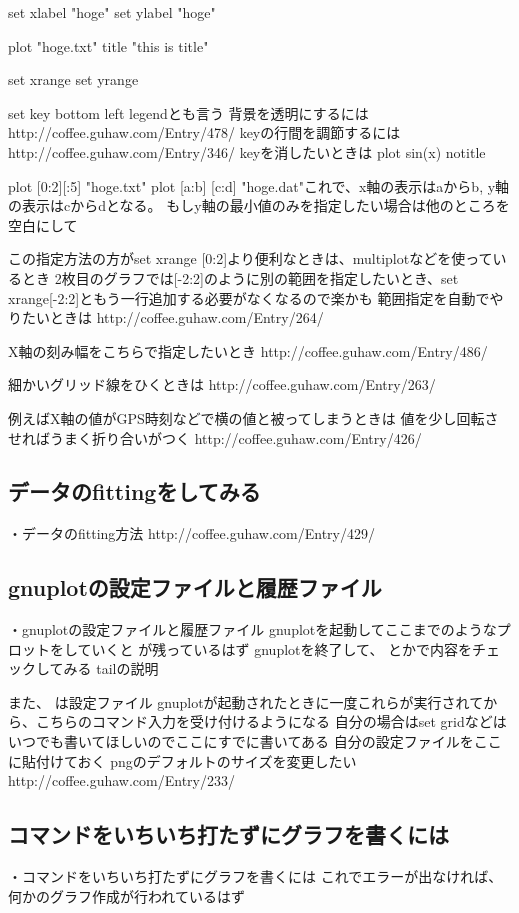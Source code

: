 \documentclass[11pt]{jsarticle}
\begin{document}
set xlabel "hoge"
set ylabel "hoge"

plot "hoge.txt" title "this is title"

set xrange
set yrange

set key bottom left
legendとも言う
背景を透明にするには
http://coffee.guhaw.com/Entry/478/
keyの行間を調節するには
http://coffee.guhaw.com/Entry/346/
keyを消したいときは
plot sin(x) notitle


plot [0:2][:5] "hoge.txt"
plot [a:b] [c:d] "hoge.dat"これで、x軸の表示はaからb, y軸の表示はcからdとなる。
もしy軸の最小値のみを指定したい場合は他のところを空白にして

この指定方法の方がset xrange [0:2]より便利なときは、multiplotなどを使っているとき
2枚目のグラフでは[-2:2]のように別の範囲を指定したいとき、set xrange[-2:2]ともう一行追加する必要がなくなるので楽かも
範囲指定を自動でやりたいときは
http://coffee.guhaw.com/Entry/264/

X軸の刻み幅をこちらで指定したいとき
http://coffee.guhaw.com/Entry/486/

細かいグリッド線をひくときは
http://coffee.guhaw.com/Entry/263/


例えばX軸の値がGPS時刻などで横の値と被ってしまうときは
値を少し回転させればうまく折り合いがつく
http://coffee.guhaw.com/Entry/426/


\subsection{データのfittingをしてみる}
・データのfitting方法
http://coffee.guhaw.com/Entry/429/


\subsection{gnuplotの設定ファイルと履歴ファイル}
・gnuplotの設定ファイルと履歴ファイル
gnuplotを起動してここまでのようなプロットをしていくと
が残っているはず
gnuplotを終了して、
とかで内容をチェックしてみる
tailの説明

また、
は設定ファイル
gnuplotが起動されたときに一度これらが実行されてから、こちらのコマンド入力を受け付けるようになる
自分の場合はset gridなどはいつでも書いてほしいのでここにすでに書いてある
自分の設定ファイルをここに貼付けておく
pngのデフォルトのサイズを変更したい
http://coffee.guhaw.com/Entry/233/


\subsection{コマンドをいちいち打たずにグラフを書くには}
・コマンドをいちいち打たずにグラフを書くには
これでエラーが出なければ、何かのグラフ作成が行われているはず
\end{document}
